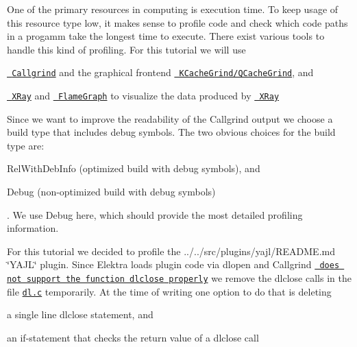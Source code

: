 One of the primary resources in computing is execution time. To keep usage of this resource type low, it makes sense to profile code and check which code paths in a progamm take the longest time to execute. There exist various tools to handle this kind of profiling. For this tutorial we will use


\begin{DoxyEnumerate}
\item \href{http://valgrind.org/docs/manual/cl-manual.html}{\texttt{ Callgrind}} and the graphical frontend \href{https://kcachegrind.github.io/html/Home.html}{\texttt{ K\+Cache\+Grind/\+Q\+Cache\+Grind}}, and
\item \href{https://llvm.org/docs/XRay.html}{\texttt{ X\+Ray}} and \href{https://github.com/brendangregg/FlameGraph}{\texttt{ Flame\+Graph}} to visualize the data produced by \href{https://llvm.org/docs/XRay.html}{\texttt{ X\+Ray}}
\end{DoxyEnumerate}

Since we want to improve the readability of the Callgrind output we choose a build type that includes debug symbols. The two obvious choices for the build type are\+:


\begin{DoxyItemize}
\item {\ttfamily Rel\+With\+Deb\+Info} (optimized build with debug symbols), and
\item {\ttfamily Debug} (non-\/optimized build with debug symbols)
\end{DoxyItemize}

. We use {\ttfamily Debug} here, which should provide the most detailed profiling information.

For this tutorial we decided to profile the ../../src/plugins/yajl/\+R\+E\+A\+D\+ME.md \char`\"{}\+Y\+A\+J\+L\char`\"{} plugin. Since Elektra loads plugin code via {\ttfamily dlopen} and Callgrind \href{https://stackoverflow.com/questions/16719395}{\texttt{ does not support the function {\ttfamily dlclose} properly}} we remove the {\ttfamily dlclose} calls in the file \href{/home/mpranj/workspace/libelektra/src/libs/loader/dl.c}{\texttt{ {\ttfamily dl.\+c}}} temporarily. At the time of writing one option to do that is deleting


\begin{DoxyItemize}
\item a single line {\ttfamily dlclose} statement, and
\item an {\ttfamily if}-\/statement that checks the return value of a {\ttfamily dlclose} call
\end{DoxyItemize}

